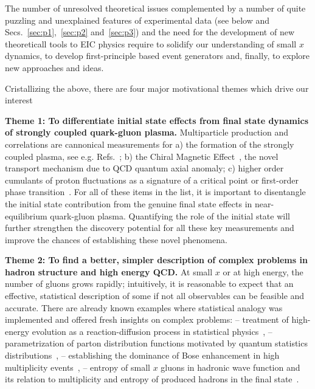 
The number of unresolved theoretical issues complemented by a number of 
quite puzzling and unexplained features of experimental data (see below and  Secs.~\ref{sec:p1},~\ref{sec:p2} and~\ref{sec:p3})  
and the need for the development of new theoreticall tools to EIC physics 
require to solidify our understanding of small $x$ dynamics, 
to develop first-principle based event generators and, finally, to  
explore new approaches and ideas. 



Cristallizing %
the above, there are four  major motivational themes which  drive our interest  

\vspace{0.5em}

\noindent
{\bf Theme 1: 
To differentiate initial state effects from  final state dynamics of strongly coupled quark-gluon plasma. 
}
Multiparticle production and correlations are cannonical measurements for a) the formation of the strongly coupled 
plasma, see e.g. Refs.~\cite{Schafer:2009dj,Song:2010mg}; b) the Chiral Magnetic Effect~\cite{Kharzeev:2007jp}, the novel transport mechanism due to QCD quantum axial anomaly;
c) higher order cumulants of proton fluctuations as a signature of a critical point or first-order phase transition~\cite{Stephanov:2008qz}. 
For all of these items in the list, it is important to disentangle the initial state contribution from 
the genuine final state effects in near-equilibrium quark-gluon plasma. Quantifying the role of the initial state 
will further strengthen the discovery potential for all these key measurements and improve the chances of 
establishing these novel phenomena.   

\vspace{0.5em}

\noindent
{\bf Theme 2: 
	To find  a better, simpler description of complex problems in hadron structure and 
high energy QCD. 
}	 
At small $x$ or at high energy, the number of gluons grows rapidly; intuitively, it is  
reasonable to expect that an effective, statistical description of some if not all 
observables can be feasible and accurate. There are already known examples where 
statistical analogy  was implemented and offered fresh insights on complex problems: 
-- treatment of high-energy evolution as a reaction-diffusion process in statistical physics~\cite{Munier:2003vc,Iancu:2004es,Kutak:2011rb}, 
-- parametrization of parton distribution functions motivated by quantum statistics distributions~\cite{Mac:1989ki,Bhalerao:1996fc,Bourrely:2001du}, 
-- establishing the dominance of Bose enhancement in high multiplicity events~\cite{Kovner:2018azs}, 
-- entropy of small $x$ gluons in hadronic wave function and its relation to 
multiplicity and entropy of produced hadrons in the final state~\cite{Peschanski:2012cw,Kovner:2015hga,Kharzeev:2017qzs,Shuryak:2017phz,Hagiwara:2017uaz}.  


